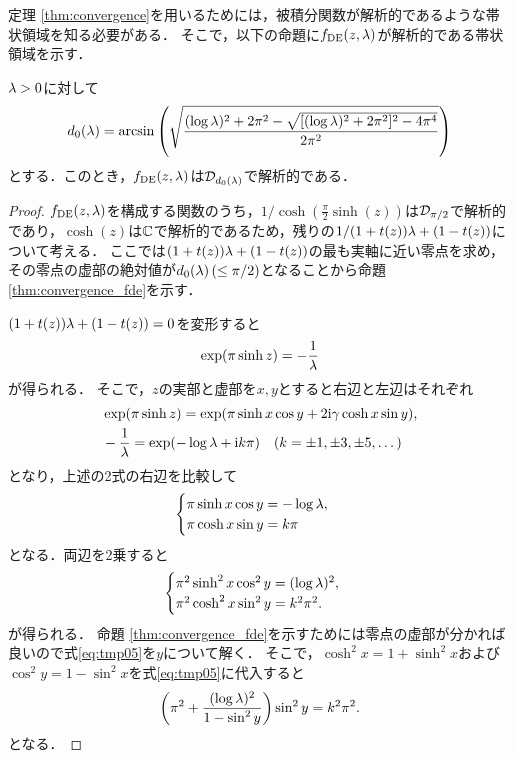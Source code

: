 \documentclass[12pt,a4paper,uplatex,dvipdfmx]{jsarticle}
\newcommand{\fde}{f_{\mathrm{DE}}}
\begin{document}
  定理 \ref{thm:convergence}を用いるためには，被積分関数が解析的であるような帯状領域を知る必要がある．
  そこで，以下の命題に$\fde(z,\lmd)$が解析的である帯状領域を示す．
  \begin{proposition}\label{thm:convergence_fde}
    $\lambda>0$に対して
    \begin{align}\label{eq:d0lambda}
      d_0(\lambda) = \arcsin \left(\sqrt{\frac{(\log\lambda)^2+ 2\pi^2 - \sqrt{[(\log\lambda)^2+ 2\pi^2]^2-4\pi^4}}{2\pi^2}}\right)
    \end{align}
    とする．このとき，$\fde(z,\lmd)$は$\mathcal{D}_{d_0(\lambda)}$で解析的である．
  \end{proposition}

  \begin{proof}
    $\fde(z,\lmd)$を構成する関数のうち，$1/\cosh(\frac{\pi}{2}\sinh(z))$は$\mathcal{D}_{\pi/2}$で解析的であり\cite{takahasi_double_1974}，$\cosh(z)$は$\mathbb{C}$で解析的であるため，残りの$1/(1+t(z))\lambda + (1-t(z))$について考える．
    ここでは$(1+t(z))\lambda + (1-t(z))$の最も実軸に近い零点を求め，その零点の虚部の絶対値が$d_0(\lambda)\,(\le \pi/2)$となることから命題\ref{thm:convergence_fde}を示す．
    
    $(1+t(z))\lambda + (1-t(z))=0$を変形すると
    \begin{align}
      \exp(\pi\sinh z) = -\frac{1}{\lambda} \label{eq:tmp01}
    \end{align}
    が得られる．
    そこで，$z$の実部と虚部を$x,y$とすると右辺と左辺はそれぞれ
    \begin{align}
      &\exp(\pi\sinh z) = \exp(\pi\sinh x \cos y + 2\mathrm{i}\gamma\cosh x\sin y), \label{eq:tmp02}\\
      &-\frac{1}{\lambda} = \exp(-\log \lambda + \mathrm{i} k\pi)\quad(k=\pm1,\pm3,\pm5,\dots) \label{eq:tmp03}
    \end{align}
    となり，上述の2式の右辺を比較して
    \begin{align}\label{eq:tmp04}
      \begin{cases}
        \pi\sinh x\cos y = -\log\lambda,\\
        \pi\cosh x\sin y = k\pi
      \end{cases}
    \end{align}
    となる．両辺を2乗すると
    \begin{align}\label{eq:tmp05}
      \begin{cases}
        \pi^2\sinh^2 x \cos^2 y = (\log\lambda)^2,\\
        \pi^2\cosh^2 x \sin^2 y = k^2\pi^2.
      \end{cases}
    \end{align}
    が得られる．
    命題 \ref{thm:convergence_fde}を示すためには零点の虚部が分かれば良いので式\eqref{eq:tmp05}を$y$について解く．
    そこで，$\cosh^2 x = 1 + \sinh^2 x$および$\cos^2 y=1-\sin^2 x$を式\eqref{eq:tmp05}に代入すると
    \begin{align}\label{eq:tmp06}
      \left(\pi^2 + \frac{(\log\lambda)^2}{1-\sin^2y}\right) \sin^2 y = k^2\pi^2.
    \end{align}
    となる．


\end{proof}
\end{document}
